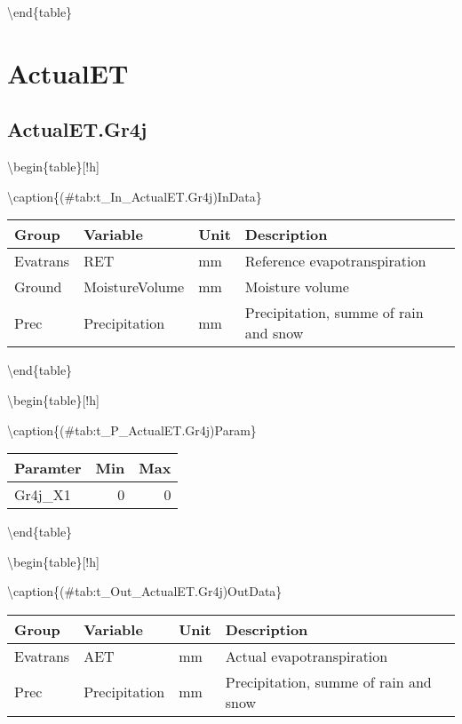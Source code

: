\documentclass[
]{book}
\begin{document}
\textbackslash end\{table\}

\hypertarget{actualet}{%
\section{ActualET}\label{actualet}}

\hypertarget{actualet.gr4j}{%
\subsection{ActualET.Gr4j}\label{actualet.gr4j}}

\textbackslash begin\{table\}{[}!h{]}

\textbackslash caption\{(\#tab:t\_In\_ActualET.Gr4j)InData\}
\centering

\begin{tabular}[t]{l|l|l|l}
\hline
Group & Variable & Unit & Description\\
\hline
Evatrans & RET & mm & Reference evapotranspiration\\
\cline{1-4}
Ground & MoistureVolume & mm & Moisture volume\\
\cline{1-4}
Prec & Precipitation & mm & Precipitation, summe of rain and snow\\
\hline
\end{tabular}

\textbackslash end\{table\}

\textbackslash begin\{table\}{[}!h{]}

\textbackslash caption\{(\#tab:t\_P\_ActualET.Gr4j)Param\}
\centering

\begin{tabular}[t]{l|r|r}
\hline
Paramter & Min & Max\\
\hline
Gr4j\_X1 & 0 & 0\\
\hline
\end{tabular}

\textbackslash end\{table\}

\textbackslash begin\{table\}{[}!h{]}

\textbackslash caption\{(\#tab:t\_Out\_ActualET.Gr4j)OutData\}
\centering

\begin{tabular}[t]{l|l|l|l}
\hline
Group & Variable & Unit & Description\\
\hline
Evatrans & AET & mm & Actual evapotranspiration\\
\cline{1-4}
Prec & Precipitation & mm & Precipitation, summe of rain and snow\\
\hline
\end{tabular}
\end{document}
